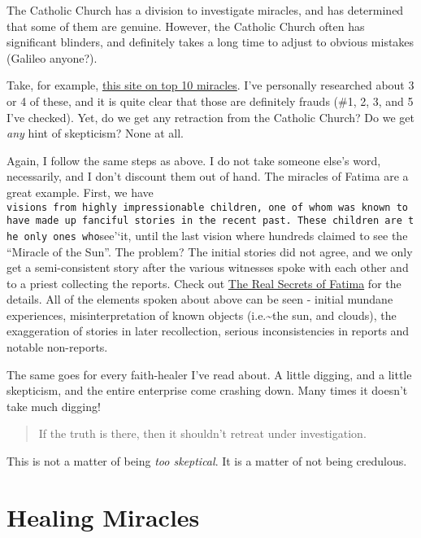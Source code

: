 \documentclass{tufte-book}
\begin{document}
The Catholic Church has a division to investigate miracles, and has
determined that some of them are genuine. However, the Catholic Church
often has significant blinders, and definitely takes a long time to
adjust to obvious mistakes (Galileo anyone?).

Take, for example,
\href{http://listverse.com/2008/07/14/top-10-astonishing-miracles/}{this
site on top 10 miracles}. I've personally researched about 3 or 4 of
these, and it is quite clear that those are definitely frauds (\#1, 2,
3, and 5 I've checked). Yet, do we get any retraction from the Catholic
Church? Do we get \emph{any} hint of skepticism? None at all.

Again, I follow the same steps as above. I do not take someone else's
word, necessarily, and I don't discount them out of hand. The miracles
of Fatima are a great example. First, we have
\texttt{visions\textquotesingle{}\textquotesingle{}\ from\ highly\ impressionable\ children,\ one\ of\ whom\ was\ known\ to\ have\ made\ up\ fanciful\ stories\ in\ the\ recent\ past.\ These\ children\ are\ the\ only\ ones\ who}see'`it,
until the last vision where hundreds claimed to see the ``Miracle of the
Sun''. The problem? The initial stories did not agree, and we only get a
semi-consistent story after the various witnesses spoke with each other
and to a priest collecting the reports. Check out
\href{http://www.csicop.org/si/show/real_secrets_of_fatima/}{The Real
Secrets of Fatima} for the details. All of the elements spoken about
above can be seen - initial mundane experiences, misinterpretation of
known objects (i.e.\textasciitilde{}the sun, and clouds), the
exaggeration of stories in later recollection, serious inconsistencies
in reports and notable non-reports.

The same goes for every faith-healer I've read about. A little digging,
and a little skepticism, and the entire enterprise come crashing down.
Many times it doesn't take much digging!

\begin{quote}
If the truth is there, then it shouldn't retreat under investigation.
\end{quote}

This is not a matter of being \emph{too skeptical}. It is a matter of
not being credulous.

\section{Healing Miracles}\label{healing-miracles}
\end{document}
